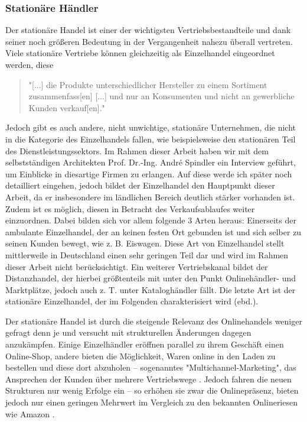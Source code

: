 \documentclass[a4paper, 12pt]{scrartcl}
\makeatletter
\newenvironment{folding}{\endgroup}{\begingroup \def \@currenvir{folding}\edef \@currenvline{\on@line}}
\makeatother
\begin{document}
\begin{folding} \subsubsection{Stationäre Händler}
Der stationäre Handel ist einer der wichtigsten Vertriebsbestandteile und dank seiner noch größeren Bedeutung in der Vergangenheit nahezu überall vertreten. Viele stationäre Vertriebe können gleichzeitig als Einzelhandel eingeordnet werden, diese
\begin{quote}
    "[...] die Produkte unterschiedlicher Hersteller zu einem Sortiment zusammenfass[en] [...] und nur an Konsumenten und nicht an gewerbliche Kunden verkauf[en]." \cite[S. 20]{Ebert}
\end{quote}
Jedoch gibt es auch andere, nicht unwichtige, stationäre Unternehmen, die nicht in die Kategorie des Einzelhandels fallen, wie beispielsweise den stationären Teil des Dienstleistungssektors. Im Rahmen dieser Arbeit haben wir mit dem selbstständigen Architekten Prof. Dr.-Ing. André Spindler ein Interview geführt, um Einblicke in diesartige Firmen zu erlangen. Auf diese werde ich später noch detailliert eingehen, jedoch bildet der Einzelhandel den Hauptpunkt dieser Arbeit, da er insbesondere im ländlichen Bereich deutlich stärker vorhanden ist. Zudem ist es möglich, diesen in Betracht des Verkaufsablaufes weiter einzuordnen. Dabei bilden sich vor allem folgende 3 Arten heraus: Einerseits der ambulante Einzelhandel, der an keinen festen Ort gebunden ist und sich selber zu seinen Kunden bewegt, wie z. B. Eiswagen. Diese Art von Einzelhandel stellt mittlerweile in Deutschland einen sehr geringen Teil dar und wird im Rahmen dieser Arbeit nicht berücksichtigt. Ein weiterer Vertriebskanal bildet der Distanzhandel, der hierbei größtenteils mit unter den Punkt Onlinehändler- und Marktplätze, jedoch auch z. T. unter Kataloghändler fällt. Die letzte Art ist der stationäre Einzelhandel, der im Folgenden charakterisiert wird (ebd.).

Der stationäre Handel ist durch die steigende Relevanz des Onlinehandels weniger gefragt denn je und versucht mit strukturellen Änderungen dagegen anzukämpfen. Einige Einzelhändler eröffnen parallel zu ihrem Geschäft einen Online-Shop, andere bieten die Möglichkeit, Waren online in den Laden zu bestellen und diese dort abzuholen – sogenanntes "Multichannel-Marketing", das Ansprechen der Kunden über mehrere Vertriebswege \cite[S. 34f]{Graf}. Jedoch fahren die neuen Strukturen nur wenig Erfolge ein – so erhöhen sie zwar die Onlinepräsenz, bieten jedoch nur einen geringen Mehrwert im Vergleich zu den bekannten Onlineriesen wie Amazon \cite[S. 34f]{Graf}. 


\end{folding}
\end{document}
